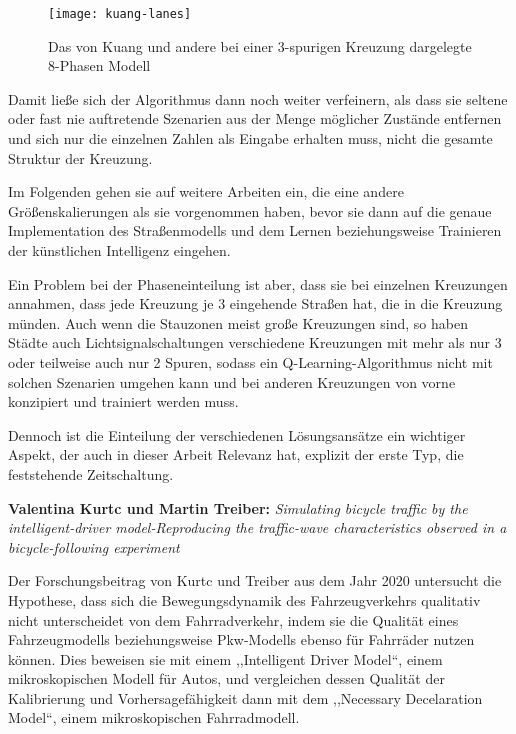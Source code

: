 \begin{figure}[h]
    \centering
    \texttt{[image: kuang-lanes]}~\caption{Das von Kuang und andere bei einer 3-spurigen Kreuzung dargelegte 8-Phasen Modell~\cite[S. 6]{Zheng2019}}
    \label{fig:kuang-lanes}
\end{figure}

Damit ließe sich der Algorithmus dann noch weiter verfeinern, als dass sie seltene oder fast nie auftretende Szenarien aus der Menge möglicher Zustände entfernen und sich nur die einzelnen Zahlen als Eingabe erhalten muss, nicht die gesamte Struktur der Kreuzung.

Im Folgenden gehen sie auf weitere Arbeiten ein, die eine andere Größenskalierungen als sie vorgenommen haben, bevor sie dann auf die genaue Implementation des Straßenmodells und dem Lernen beziehungsweise Trainieren der künstlichen Intelligenz eingehen.

Ein Problem bei der Phaseneinteilung ist aber, dass sie bei einzelnen Kreuzungen annahmen, dass jede Kreuzung je 3 eingehende Straßen hat, die in die Kreuzung münden.
Auch wenn die Stauzonen meist große Kreuzungen sind, so haben Städte auch Lichtsignalschaltungen verschiedene Kreuzungen mit mehr als nur 3 oder teilweise auch nur 2 Spuren, sodass ein Q-Learning-Algorithmus nicht mit solchen Szenarien umgehen kann und bei anderen Kreuzungen von vorne konzipiert und trainiert werden muss.

Dennoch ist die Einteilung der verschiedenen Lösungsansätze ein wichtiger Aspekt, der auch in dieser Arbeit Relevanz hat, explizit der erste Typ, die feststehende Zeitschaltung.


\textbf{Valentina Kurtc und Martin Treiber:}
\textit{Simulating bicycle traffic by the intelligent-driver model-Reproducing the traffic-wave characteristics observed in a bicycle-following experiment}

Der Forschungsbeitrag von Kurtc und Treiber aus dem Jahr 2020 untersucht die Hypothese, dass sich die Bewegungsdynamik des Fahrzeugverkehrs qualitativ nicht unterscheidet von dem Fahrradverkehr, indem sie die Qualität eines Fahrzeugmodells beziehungsweise Pkw-Modells ebenso für Fahrräder nutzen können.
Dies beweisen sie mit einem ,,Intelligent Driver Model``\cite[S. 20]{Kurtc2020}, einem mikroskopischen Modell für Autos, und vergleichen dessen Qualität der Kalibrierung und Vorhersagefähigkeit dann mit dem ,,Necessary Decelaration Model``\cite[S. 20]{Kurtc2020}, einem mikroskopischen Fahrradmodell.

